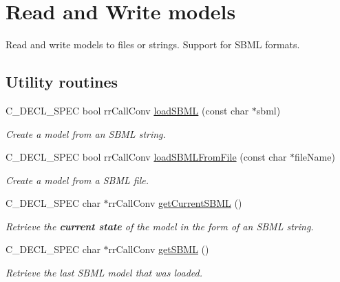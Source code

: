 \hypertarget{group__loadsave}{
\section{\-Read and \-Write models}
\label{group__loadsave}
}


\-Read and write models to files or strings. \-Support for \-S\-B\-M\-L formats.  


\subsection*{\-Utility routines}
\begin{DoxyCompactItemize}
\item 
\-C\-\_\-\-D\-E\-C\-L\-\_\-\-S\-P\-E\-C bool rr\-Call\-Conv \hyperlink{group__utility_ga4105f02dfdb959175f30cecebfb1c081}{load\-S\-B\-M\-L} (const char $\ast$sbml)
\begin{DoxyCompactList}\small\item\em \-Create a model from an \-S\-B\-M\-L string. \end{DoxyCompactList}\item 
\-C\-\_\-\-D\-E\-C\-L\-\_\-\-S\-P\-E\-C bool rr\-Call\-Conv \hyperlink{group__utility_gae4aa1daa0773e256698353861e3d1ef3}{load\-S\-B\-M\-L\-From\-File} (const char $\ast$file\-Name)
\begin{DoxyCompactList}\small\item\em \-Create a model from a \-S\-B\-M\-L file. \end{DoxyCompactList}\item 
\-C\-\_\-\-D\-E\-C\-L\-\_\-\-S\-P\-E\-C char $\ast$rr\-Call\-Conv \hyperlink{group__utility_gade5df220f410e86123128a2b617b6ec5}{get\-Current\-S\-B\-M\-L} ()
\begin{DoxyCompactList}\small\item\em \-Retrieve the {\bfseries current state} of the model in the form of an \-S\-B\-M\-L string. \end{DoxyCompactList}\item 
\-C\-\_\-\-D\-E\-C\-L\-\_\-\-S\-P\-E\-C char $\ast$rr\-Call\-Conv \hyperlink{group__utility_ga05a79ded419b52fa2965fce1700c0e82}{get\-S\-B\-M\-L} ()
\begin{DoxyCompactList}\small\item\em \-Retrieve the last \-S\-B\-M\-L model that was loaded. \end{DoxyCompactList}\end{DoxyCompactItemize}


